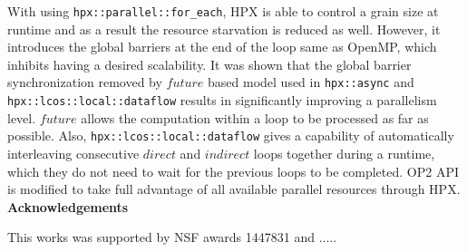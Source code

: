 \documentclass[conference]{IEEEtran}
\begin{document}
With using \texttt{hpx::parallel::for\_each}, HPX is able to control a grain size at runtime and as a result the resource starvation is reduced as well. However, it introduces the global barriers at the end of the loop same as OpenMP, which inhibits having a desired scalability. It was shown that the global barrier synchronization removed by $future$ based model used in \texttt{hpx::async} and \texttt{hpx::lcos::local::dataflow} results in significantly improving a parallelism level. $future$ allows the computation within a loop to be processed as far as possible. Also, \texttt{hpx::lcos::local::dataflow} gives a capability of automatically interleaving consecutive $direct$ and $indirect$ loops together during a runtime, which they do not need to wait for the previous loops to be completed. OP2 API is modified to take full advantage of all available parallel resources through HPX. \\

\noindent
\textbf{Acknowledgements}

 This works was supported by NSF awards 1447831 and .....




 




\end{document}
